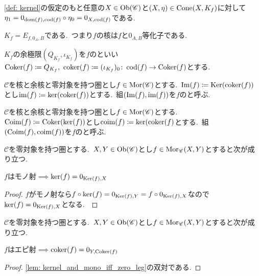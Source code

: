 \begin{remark} \label{rem: kernel_cone_zero_leg}
\cref{def: kernel}の仮定のもと任意の$X \in \operatorname{Ob}(\mathscr{C})$と$(X, \eta) \in \operatorname{Cone}(X,K_f)$に対して$\eta_1 = 0_{\operatorname{dom}(f), \operatorname{cod}(f)} \circ \eta_0 = 0_{X, \operatorname{cod}(f)}$である.
\end{remark}

\begin{remark} \label{rem: kernel_is_equalizer}
$K_f = E_{f, 0_A,B}$である.\ つまり$f$の核は$f$と$0_{A,B}$等化子である.
\end{remark}

\begin{definition} \label{def: cokernel}
	$K_f$の余極限$(Q_{K_f}, \iota_{K_f})$を$f$のといい$\operatorname{Coker}(f) \coloneq Q_{K_f},\ \operatorname{coker}(f) \coloneq (\iota_{K_f})_0 \colon \operatorname{cod}(f) \to \operatorname{Coker}(f)$とする.
\end{definition}

\begin{definition} \label{def: image}
$\mathscr{C}$を核と余核と零対象を持つ圏とし$f \in \operatorname{Mor}({\mathscr{C}})$とする.\
$\operatorname{Im}(f) \coloneq \operatorname{Ker}(\operatorname{coker}(f))$とし$\operatorname{im}(f) \coloneq \ker(\operatorname{coker}(f))$とする.\
組$(\operatorname{Im}(f), \operatorname{im}(f))$を$f$のと呼ぶ.\
\end{definition}

\begin{definition} \label{def: coimage}
$\mathscr{C}$を核と余核と零対象を持つ圏とし$f \in \operatorname{Mor}(\mathscr{C})$とする.\
$\operatorname{Coim}(f) \coloneq \operatorname{Coker}(\ker(f))$とし$\operatorname{coim}(f) \coloneq \ker(\operatorname{coker}(f)$とする.\
組$(\operatorname{Coim}(f), \operatorname{coim}(f))$を$f$のと呼ぶ.\
\end{definition}

\begin{lemma} \label{lem: kernel_and_mono_iff_zero_leg}
$\mathscr{C}$を零対象を持つ圏とする.\
$X,Y \in \operatorname{Ob}(\mathscr{C})$とし$f \in \operatorname{Mor}_{\mathscr{C}}(X,Y)$とすると次が成り立つ.\
\begin{center}
	$f$はモノ射$\implies$$\ker(f) = 0_{\operatorname{Ker}(f),X}$
\end{center}
\end{lemma}

\begin{proof}
$f$がモノ射なら$f \circ \ker(f) = 0_{\operatorname{Ker}(f), Y} = f \circ 0_{\operatorname{Ker}(f),X}$なので$\ker(f) = 0_{\operatorname{Ker}(f),X}$となる.\
\end{proof}

\begin{lemma} \label{lem: cokernel_and_epi_iff_zero_leg}
$\mathscr{C}$を零対象を持つ圏とする.\
$X,Y \in \operatorname{Ob}(\mathscr{C})$とし$f \in \operatorname{Mor}_{\mathscr{C}}(X,Y)$とすると次が成り立つ.\
\begin{center}
	$f$はエピ射$\implies$$\operatorname{coker}(f) = 0_{Y,\operatorname{Coker}(f)}$ 
\end{center}
\end{lemma}

\begin{proof}
	\cref{lem: kernel_and_mono_iff_zero_leg}の双対である.
\end{proof}
